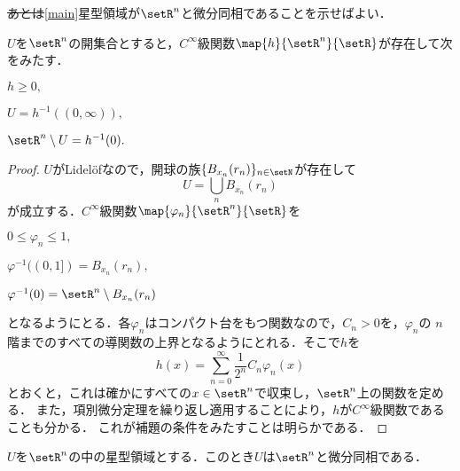 \documentclass[uplatex]{jsarticle}
\providecommand{\DIFadd}[1]{{\protect\color{blue}\uwave{#1}}} %
\providecommand{\DIFdel}[1]{{\protect\color{red}\sout{#1}}}                      %
\providecommand{\DIFaddbegin}{} %
\providecommand{\DIFaddend}{} %
\providecommand{\DIFdelbegin}{} %
\providecommand{\DIFdelend}{} %
\begin{document}
\DIFdelbegin \DIFdel{あとは}\DIFdelend \DIFaddbegin \DIFadd{以上より、}\cref{main}\DIFadd{を示すには}\DIFaddend 星型領域が$\setR^n$と微分同相であることを示せばよい．

\begin{lemma}\label{function}
$U$を$\setR^n$の開集合とすると，$C^\infty$級関数$\map{h}{\setR^n}{\setR}$が存在して次をみたす．
\begin{enumarabicp}
  \item $h\geq 0,$
  \item $U=h^{-1}((0,\infty)),$
  \item $\setR^n\setminus U = h^{-1}(0).$
\end{enumarabicp}
\end{lemma}

\begin{proof}
  $U$がLidel\"{o}fなので，開球の族$\{B_{x_n}(r_n)\}_{n\in \setN}$が存在して
    \[U = \bigcup_n B_{x_n}(r_n)\]
  が成立する．$C^\infty$級関数$\map{\varphi_n}{\setR^n}{\setR}$を
  \begin{enumarabicp}
    \item $0\leq \varphi_n \leq 1,$
    \item $\varphi^{-1}((0,1])=B_{x_n}(r_n),$
    \item $\varphi^{-1}(0)=\setR^n\setminus B_{x_n}(r_n)$
  \end{enumarabicp}
  となるようにとる．各$\varphi_n$はコンパクト台をもつ関数なので，$C_n>0$を，$\varphi_n$の
  $n$階までのすべての導関数の上界となるようにとれる．そこで$h$を
    \[h(x)=\sum_{n=0}^\infty \frac{1}{2^n} C_n \varphi_n(x)\]
  とおくと，これは確かにすべての$x\in \setR^n$で収束し，$\setR^n$上の関数を定める．
  また，項別微分定理を繰り返し適用することにより，$h$が$C^\infty$級関数であることも分かる．
  これが補題の条件をみたすことは明らかである．
\end{proof}

\begin{proposition}
  $U$を$\setR^n$の中の星型領域とする．このとき$U$は$\setR^n$と微分同相である．
\end{proposition}
\end{document}
